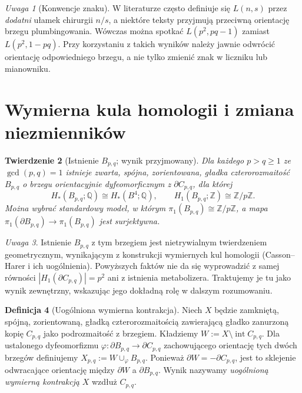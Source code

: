 \documentclass[11pt,a4paper]{report}
\numberwithin{equation}{section}
\theoremstyle{plain}
\newtheorem{twierdzenie}{Twierdzenie}[section]
\theoremstyle{definition}
\newtheorem{definicja}[twierdzenie]{Definicja}
\theoremstyle{remark}
\newtheorem{uwaga}[twierdzenie]{Uwaga}
\begin{document}
\begin{uwaga}[Konwencje znaku]
W literaturze często definiuje się $L(n,s)$ przez
\emph{dodatni} ułamek chirurgii $n/s$, a niektóre teksty
przyjmują przeciwną orientację brzegu plumbingowania.
Wówczas można spotkać $L(p^2,pq-1)$ zamiast
$L(p^2,1-pq)$. Przy korzystaniu z takich wyników
należy jawnie odwrócić orientację odpowiedniego brzegu,
a nie tylko zmienić znak w liczniku lub mianowniku.
\end{uwaga}

\section{Wymierna kula homologii i zmiana niezmienników}
\label{sec:tg-general-operation}

\begin{twierdzenie}[Istnienie $B_{p,q}$; wynik przyjmowany]
\label{thm:tg-general-ball}
Dla każdego $p>q\geq1$ ze $\gcd(p,q)=1$ istnieje
zwarta, spójna, zorientowana, gładka czterorozmaitość
$B_{p,q}$ o brzegu orientacyjnie dyfeomorficznym z
$\partial C_{p,q}$, dla której
\[
H_*(B_{p,q};\mathbb Q)\cong H_*(B^4;\mathbb Q),
\qquad H_1(B_{p,q};\mathbb Z)\cong\mathbb Z/p\mathbb Z.
\]
Można wybrać standardowy model, w którym
$\pi_1(B_{p,q})\cong\mathbb Z/p\mathbb Z$, a mapa
$\pi_1(\partial B_{p,q})\to\pi_1(B_{p,q})$ jest surjektywna.
\end{twierdzenie}

\begin{uwaga}
Istnienie $B_{p,q}$ z tym brzegiem jest nietrywialnym
twierdzeniem geometrycznym, wynikającym z konstrukcji
wymiernych kul homologii (Casson--Harer i ich uogólnienia).
Powyższych faktów nie da się wyprowadzić z samej równości
$|H_1(\partial C_{p,q})|=p^2$ ani z istnienia metabolizera.
Traktujemy je tu jako wynik zewnętrzny, wskazując jego dokładną
rolę w dalszym rozumowaniu.
\end{uwaga}

\begin{definicja}[Uogólniona wymierna kontrakcja]
Niech $X$ będzie zamkniętą, spójną, zorientowaną,
gładką czterorozmaitością zawierającą gładko zanurzoną
kopię $C_{p,q}$ jako podrozmaitość z brzegiem.
Kładziemy $W:=X\setminus\operatorname{int}C_{p,q}$.
Dla ustalonego dyfeomorfizmu
$\varphi:\partial B_{p,q}\to\partial C_{p,q}$ zachowującego
orientację tych dwóch brzegów definiujemy
$X_{p,q}:=W\cup_{\varphi}B_{p,q}$.
Ponieważ $\partial W=-\partial C_{p,q}$, jest to
sklejenie odwracające orientację między $\partial W$
a $\partial B_{p,q}$. Wynik nazywamy
\emph{uogólnioną wymierną kontrakcją} $X$ wzdłuż $C_{p,q}$.
\end{definicja}
\end{document}
